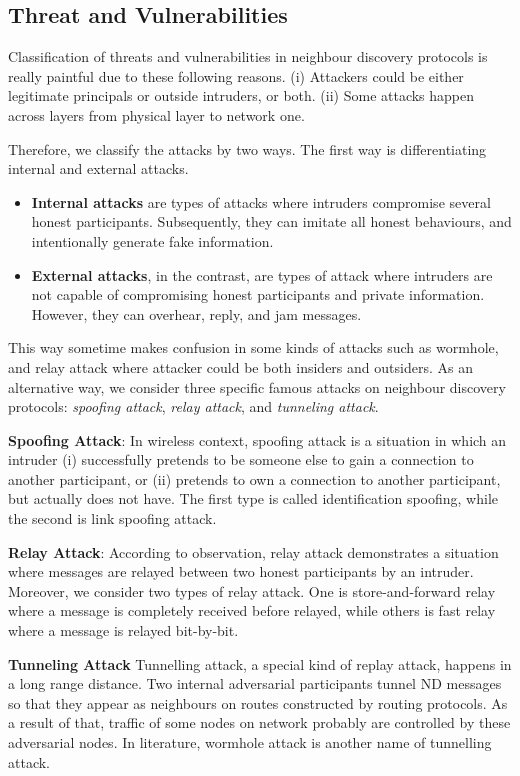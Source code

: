 \subsection{Threat and Vulnerabilities}\label{threatndp}
Classification of threats and vulnerabilities in neighbour discovery protocols is really paintful due to these following reasons. (i) Attackers could be either legitimate principals or outside intruders, or both. (ii) Some attacks happen across layers from physical layer to network one. 

Therefore, we classify the attacks by two ways. The first way is differentiating internal and external attacks. 

\begin{itemize}
\item \textbf{Internal attacks} are types of attacks where intruders compromise several honest participants. Subsequently, they can imitate all honest behaviours, and intentionally generate fake information. 
\item \textbf{External attacks}, in the contrast, are types of attack where intruders are not capable of compromising honest participants and private information. However, they can overhear, reply, and jam messages. 
\end{itemize}

This way sometime makes confusion in some kinds of attacks such as wormhole, and relay attack where attacker could be both insiders and outsiders. As an alternative way, we consider three specific famous attacks on neighbour discovery protocols: \emph{spoofing attack}, \emph{relay attack}, and \emph{tunneling attack}.

\textbf{Spoofing Attack}: In wireless context, spoofing attack is a situation in which an intruder (i) successfully pretends to be someone else to gain a connection to another participant, or (ii) pretends to own a connection to another participant, but actually does not have. The first type is called identification spoofing, while the second is link spoofing attack. 

\textbf{Relay Attack}: According to observation, relay attack demonstrates a situation where messages are relayed between two honest participants by an intruder. Moreover, we consider two types of relay attack. One is store-and-forward relay where a message is completely received before relayed, while others is fast relay where a message is relayed bit-by-bit. 

\textbf{Tunneling Attack} Tunnelling attack, a special kind of replay attack, happens in a long range distance. Two internal adversarial participants tunnel ND messages so that they appear as neighbours on routes constructed by routing protocols. As a result of that, traffic of some nodes on network probably are controlled by these adversarial nodes. In literature, wormhole attack is another name of tunnelling attack. 

